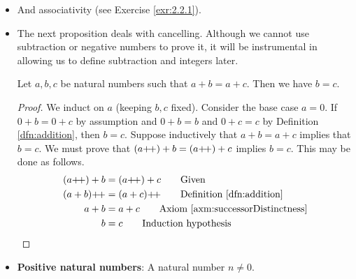 \documentclass[../main.tex]{subfiles}
\begin{document}
\begin{itemize}
\begin{prop}
        For any natural numbers $n$ and $m$, $n+m=m+n$.
        \begin{proof}
            For all $m\in\N$, Definition \ref{dfn:addition} gives us $0+m=m$ and Lemma \ref{lem:nplus0} gives us $m+0=m$. Since both of the previous statements equal $m$, $0+m=m+0$. Suppose inductively that $n\in\N$ and $n+m=m+n$. If this is true, then
            \begin{align*}
                (n\pplus)+m &= (n+m)\pplus\tag*{Definition \ref{dfn:addition}}\\
                &= (m+n)\pplus\tag*{Induction hypothesis}\\
                &= m+(n\pplus)\tag*{Lemma \ref{lem:nplusmpplus}}
            \end{align*}
            This closes the induction.
        \end{proof}
    \end{prop}
    \item And associativity (see Exercise \ref{exr:2.2.1}).
    \item The next proposition deals with cancelling. Although we cannot use subtraction or negative numbers to prove it, it will be instrumental in allowing us to define subtraction and integers later.
    \begin{prop}\label{prp:cancellation}
        Let $a,b,c$ be natural numbers such that $a+b=a+c$. Then we have $b=c$.
        \begin{proof}
            We induct on $a$ (keeping $b,c$ fixed). Consider the base case $a=0$. If $0+b=0+c$ by assumption and $0+b=b$ and $0+c=c$ by Definition \ref{dfn:addition}, then $b=c$. Suppose inductively that $a+b=a+c$ implies that $b=c$. We must prove that $(a{+\!+})+b=(a{+\!+})+c$ implies $b=c$. This may be done as follows.
            \begin{align*}
                (a\pplus)+b &= (a\pplus)+c\tag*{Given}\\
                (a+b)\pplus &= (a+c)\pplus\tag*{Definition \ref{dfn:addition}}\\
                a+b &= a+c\tag*{Axiom \ref{axm:successorDistinctness}}\\
                b &= c\tag*{Induction hypothesis}
            \end{align*}
        \end{proof}
    \end{prop}
    \item \textbf{Positive natural numbers}: A natural number $n\neq 0$.
    \begin{prop}\label{prp:AplusBpositive}

\end{prop}
\end{itemize}
\end{document}
